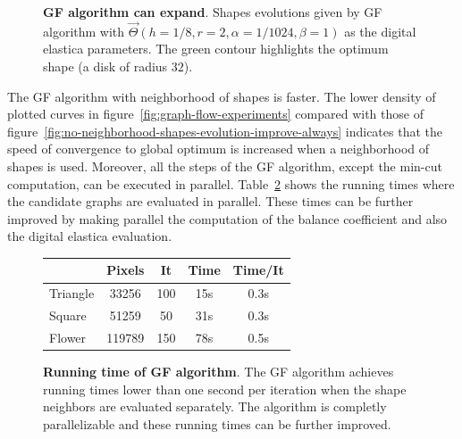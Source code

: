 \documentclass[smallextended]{svjour3}
\begin{document}
\begin{figure}
\caption{\textbf{GF algorithm can expand}. Shapes evolutions given by GF algorithm with $\vec{\Theta}(h=1/8,r=2,\alpha=1/1024, \beta=1)$ as the digital elastica parameters. The green contour highlights the optimum shape (a disk of radius $32$).}
\label{fig:graph-flow-expand}
\end{figure}

The GF algorithm with neighborhood of shapes is faster. The lower density of plotted curves in figure~\ref{fig:graph-flow-experiments} compared with those of figure~\ref{fig:no-neighborhood-shapes-evolution-improve-always} indicates that the speed of convergence to global optimum is increased when a neighborhood of shapes is used. Moreover,  all the steps of the GF algorithm, except the min-cut computation, can be executed in parallel. Table~\ref{tab:summary-graph-flow-running-time} shows the running times where the candidate graphs are evaluated in parallel. These times can be further improved by making parallel the computation of the balance coefficient and also the digital elastica evaluation.

\begin{figure}[h!]
\center
\captionsetup{type=table}
\footnotesize
\begin{tabular}{|l|c|c|c|c|}
\hline
& Pixels & It & Time & Time/It\\
\hline
Triangle & 33256 & 100 & 15s & 0.3s \\
Square & 51259 & 50 & 31s & 0.3s \\
Flower & 119789 & 150 & 78s & 0.5s \\
\hline
\end{tabular}
\caption{\textbf{Running time of GF algorithm}. The GF algorithm achieves running times lower than one second per iteration when the shape neighbors are evaluated separately. The algorithm is completly parallelizable and these running times can be further improved.}
\label{tab:summary-graph-flow-running-time} 
\end{figure}
\end{document}
